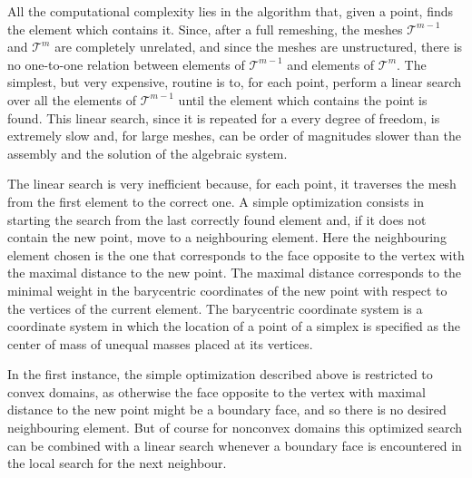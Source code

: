 \documentclass[a4paper,12pt,onecolumn]{article}
\begin{document}
All the computational complexity lies in the algorithm that, given a point,
finds the element which contains it. Since, after a full remeshing, the meshes
$\mathcal{T}^{m-1}$ and $\mathcal{T}^m$ are completely unrelated, and since the
meshes are unstructured, there is no one-to-one relation between elements of
$\mathcal{T}^{m-1}$ and elements of $\mathcal{T}^m$. The simplest, but very
expensive, routine is to, for each point, perform a linear search over all the
elements of $\mathcal{T}^{m-1}$ until the element which contains the point is
found. This linear search, since it is repeated for a every degree of freedom,
is extremely slow and, for large meshes, can be order of magnitudes slower
than the assembly and the solution of the algebraic system.

The linear search is very inefficient because, for each point, it traverses the
mesh from the first element to the correct one. A simple optimization consists
in starting the search from the last correctly found element and, if it does not
contain the new point, move to a neighbouring element. Here the neighbouring
element chosen is the one that corresponds to the face opposite to the vertex
with the maximal distance to the new point. The maximal distance corresponds to
the minimal weight in the barycentric coordinates of the new point with respect
to the vertices of the current element. The barycentric coordinate system is a
coordinate system in which the location of a point of a simplex is specified as
the center of mass of unequal masses placed at its vertices.

In the first instance, the simple optimization described above is restricted to
convex domains, as otherwise the face opposite to the vertex with maximal
distance to the new point might be a boundary face, and so there is no desired
neighbouring element. But of course for nonconvex domains this optimized search
can be combined with a linear search whenever a boundary face is encountered in
the local search for the next neighbour.
\end{document}
